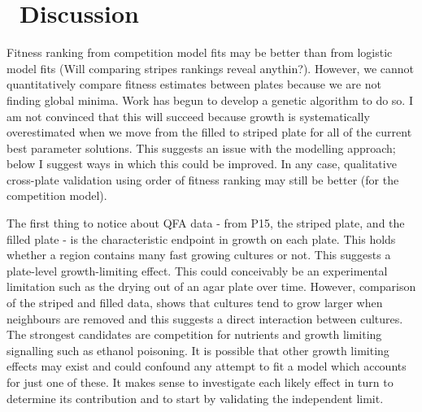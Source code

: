 \graphicspath{{images/}}

\section{\thesection~Discussion}
\label{sec:discussion}

Fitness ranking from competition model fits may be better than from
logistic model fits (Will comparing stripes rankings reveal
anythin?). However, we cannot quantitatively compare fitness estimates
between plates because we are not finding global minima. Work has
begun to develop a genetic algorithm to do so. I am not convinced that
this will succeed because growth is systematically overestimated when
we move from the filled to striped plate for all of the current best
parameter solutions. This suggests an issue with the modelling
approach; below I suggest ways in which this could be improved. In
any case, qualitative cross-plate validation using order of fitness
ranking may still be better (for the competition model).

The first thing to notice about QFA data - from P15, the striped
plate, and the filled plate - is the characteristic endpoint in growth
on each plate. This holds whether a region contains many fast growing
cultures or not. This suggests a plate-level growth-limiting
effect. This could conceivably be an experimental limitation such as
the drying out of an agar plate over time. However, comparison of the
striped and filled data, shows that cultures tend to grow larger when
neighbours are removed and this suggests a direct interaction between
cultures. The strongest candidates are competition for nutrients and
growth limiting signalling such as ethanol poisoning. It is possible
that other growth limiting effects may exist and could confound any
attempt to fit a model which accounts for just one of these. It makes
sense to investigate each likely effect in turn to determine its
contribution and to start by validating the independent limit.

